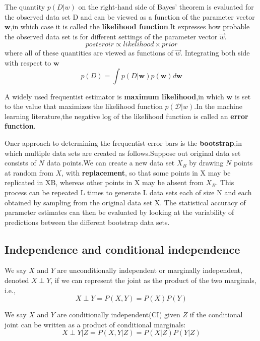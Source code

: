 The quantity $p(D|w)$ on the right-hand side of Bayes' theorem is evaluated for the observed data set D and 
can be viewed as a function of the parameter vector $\mathbf{w}$,in which case it is called the \textbf{likelihood function}.It expresses how probable the observed data set is for different settings of the parameter vector $\vec{w}$.
\begin{equation}
posteroir \propto likelihood \times prior
\end{equation}
where all of these quantities are viewed as functions of $\vec{w}$.
 Integrating both side with respect to $\mathbf{w}$
 \begin{equation}
p(D) = \int p(D|\mathbf{w}) p(\mathbf{w})d\mathbf{w} 
 \end{equation}

A widely used frequentist estimator is \textbf{maximum likelihood},in which $\mathbf{w}$ is set to the value that maximizes the likelihood function $p(\mathcal{D}|w)$.In the machine learning literature,the negative log of the likelihood function is called an \textbf{error function}.

Oner approach to determining the frequentist error bars is the \textbf{bootstrap},in which multiple data sets are created as follows.Suppose out original data set consists of $N$ data points.We can create a new data set $X_B$ by drawing $N$ points at random from $X$, with \textbf{replacement}, so that some points in X may be replicated in XB, whereas other points in X may be absent from $X_B$. This process can be repeated L times to generate L data sets each of size N and each obtained by sampling from the original data set X. The statistical accuracy of parameter estimates can then be evaluated by looking at the variability of predictions between the different bootstrap data sets.



\subsection{Independence and conditional independence}
We say $X$ and $Y$ are unconditionally independent or marginally independent, denoted $X \perp Y$, if we can represent the joint as the product of the two marginals, i.e.,
\begin{equation}
X \perp Y=P(X,Y)=P(X)P(Y)
\end{equation}

We say $X$ and $Y$ are conditionally independent(CI) given $Z$ if the conditional joint can be written as a product of conditional marginals:
\begin{equation}
X \perp Y|Z=P(X,Y|Z)=P(X|Z)P(Y|Z)
\end{equation}

